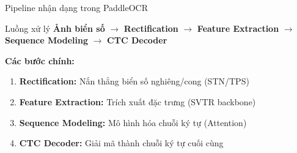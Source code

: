 \begin{frame}{Pipeline nhận dạng trong PaddleOCR}
    \begin{block}{Luồng xử lý}
    \centering
    \small
    \textbf{Ảnh biển số} $\rightarrow$ \textbf{Rectification} $\rightarrow$ \textbf{Feature Extraction} $\rightarrow$ \textbf{Sequence Modeling} $\rightarrow$ \textbf{CTC Decoder}
    \end{block}
    
    \vspace{0.5em}
    \textbf{Các bước chính:}
    \begin{enumerate}
        \item \textbf{Rectification:} Nắn thẳng biển số nghiêng/cong (STN/TPS)
        \item \textbf{Feature Extraction:} Trích xuất đặc trưng (SVTR backbone)
        \item \textbf{Sequence Modeling:} Mô hình hóa chuỗi ký tự (Attention)
        \item \textbf{CTC Decoder:} Giải mã thành chuỗi ký tự cuối cùng
    \end{enumerate}
\end{frame}


